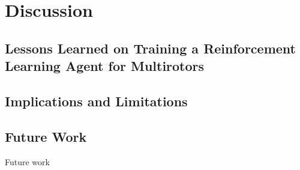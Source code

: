 \chapter{Discussion}
\section{Lessons Learned on Training a Reinforcement Learning Agent for Multirotors}
\section{Implications and Limitations}
\section{Future Work}
Future work 